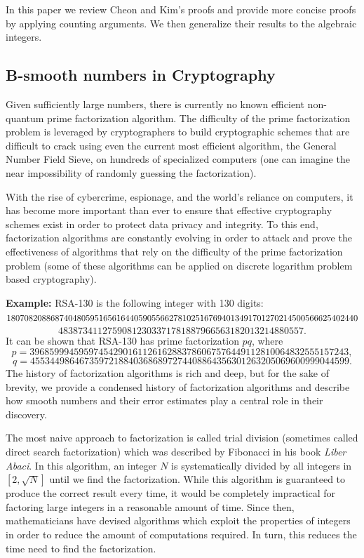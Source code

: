 \documentclass[12pt]{amsart}
\theoremstyle{definition}
\begin{document}
In this paper we review Cheon and Kim's proofs and provide more concise proofs by applying counting arguments. We then generalize their results to the algebraic integers. 

\subsection{B-smooth numbers in Cryptography}
Given sufficiently large numbers, there is currently no known efficient non-quantum prime factorization algorithm.
The difficulty of the prime factorization problem is leveraged by cryptographers to build cryptographic schemes that are difficult to crack using even the current most efficient algorithm, the General Number Field Sieve, on hundreds of specialized computers (one can imagine the near impossibility of randomly guessing the factorization). 

With the rise of cybercrime, espionage, and the world's reliance on computers, it has become more important than ever to ensure that effective cryptography schemes exist in order to protect data privacy and integrity. To this end, factorization algorithms are constantly evolving in order to attack and prove the effectiveness of algorithms that rely on the difficulty of the prime factorization problem (some of these algorithms can be applied on discrete logarithm problem based cryptography).

\noindent\textbf{Example:} RSA-130 is the following integer with 130 digits:
$$18070820886874048059516561644059055662781025167694013491701270214500566625402440\\$$
\vspace{-.7 in}
$$48387341127590812303371781887966563182013214880557.$$
\noindent It can be shown that RSA-130 has prime factorization $pq$, where
$$p = 39685999459597454290161126162883786067576449112810064832555157243,$$
\vspace{-.7 in}
$$q = 45534498646735972188403686897274408864356301263205069600999044599.$$
The history of factorization algorithms is rich and deep, but for the sake of brevity, we provide a condensed history of factorization algorithms and describe how smooth numbers and their error estimates play a central role in their discovery.

The most naive approach to factorization is called trial division (sometimes called direct search factorization) which was described by Fibonacci in his book \textit{Liber Abaci}. In this algorithm, an integer $N$ is systematically divided by all integers in $[2, \sqrt{N}]$ until we find the factorization. While this algorithm is guaranteed to produce the correct result every time, it would be completely impractical for factoring large integers in a reasonable amount of time. Since then, mathematicians have devised algorithms which exploit the properties of integers in order to reduce the amount of computations required. In turn, this reduces the time need to find the factorization.
\end{document}
